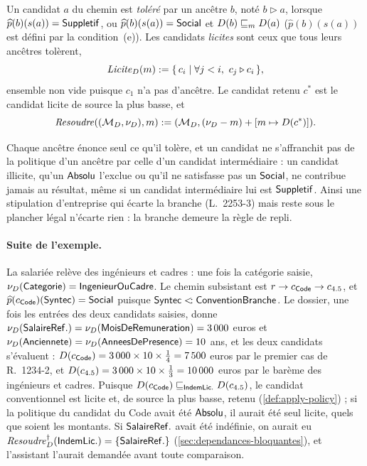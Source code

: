 \documentclass[review]{jflart}
\begin{document}
\begin{defi}\label{def:apply-policy}
Un candidat \(a\) du chemin est \emph{toléré} par un ancêtre \(b\), noté $b\triangleright a$, lorsque
\(\widehat p(b)(s(a))=\mathsf{Suppletif}\), ou \(\widehat p(b)(s(a))=\mathsf{Social}\) et
\(D(b)\mathrel{\sqsubseteq_{m}}D(a)\) (\(\widehat p(b)(s(a))\) est défini par la
condition~(e)). Les candidats \emph{licites} sont ceux que tous leurs
ancêtres tolèrent,
\[
 \mathit{Licite}_D(m):=\{\,c_i\mid \forall j<i,\ c_j \triangleright c_i\,\},
\]
ensemble non vide puisque \(c_1\) n'a pas d'ancêtre. Le candidat retenu
\(c^*\) est le candidat licite de source la plus basse, et
\begin{equation}
 \mathit{Resoudre}((\mathcal{M}_D,\nu_D),m):=(\mathcal{M}_D,(\nu_D-m)+[m\mapsto D(c^*)]).
 \label{eq:resolve}
\end{equation}
\end{defi}

Chaque ancêtre énonce seul ce qu'il tolère, et un candidat ne s'affranchit pas
de la politique d'un ancêtre par celle d'un candidat intermédiaire : un
candidat illicite, qu'un \(\mathsf{Absolu}\) l'exclue ou qu'il ne satisfasse pas un
\(\mathsf{Social}\), ne contribue jamais au résultat, même si un candidat
intermédiaire lui est \(\mathsf{Suppletif}\). Ainsi une stipulation d'entreprise qui
écarte la branche (L.~2253-3) mais reste sous le plancher légal n'écarte
rien : la branche demeure la règle de repli.

\paragraph{Suite de l'exemple.}
La salariée relève des ingénieurs et cadres : une fois la catégorie saisie,
\(\nu_D(\mathsf{Categorie})=\mathsf{IngenieurOuCadre}\). Le chemin subsistant est
\(r\to c_{\mathsf{Code}}\to c_{4.5}\), et
\(\widehat p(c_{\mathsf{Code}})(\mathsf{Syntec})=\mathsf{Social}\) puisque \(\mathsf{Syntec}\mathrel{<\!:}\mathsf{ConventionBranche}\).
Le dossier, une fois les entrées des deux candidats saisies, donne
\(\nu_D(\mathsf{SalaireRef.})=\nu_D(\mathsf{MoisDeRemuneration})=3\,000\) euros et
\(\nu_D(\mathsf{Anciennete})=\nu_D(\mathsf{AnneesDePresence})=10\) ans,
et les deux candidats s'évaluent : \(D(c_{\mathsf{Code}})=3\,000\times10\times\frac14
=7\,500\) euros par le premier cas de R.~1234-2, et
\(D(c_{4.5})=3\,000\times10\times\frac13=10\,000\) euros par le barème des
ingénieurs et cadres. Puisque \(D(c_{\mathsf{Code}})\mathrel{\sqsubseteq_{\mathsf{IndemLic.}}}D(c_{4.5})\),
le candidat conventionnel est licite et, de source la plus basse, retenu
(\autoref{def:apply-policy}) ; si la politique du candidat du Code avait été
\(\mathsf{Absolu}\), il aurait été seul licite, quels que soient les montants. Si
\(\mathsf{SalaireRef.}\) avait été indéfinie, on aurait eu
\(\mathit{Resoudre}^\dagger_D(\mathsf{IndemLic.})=\{\mathsf{SalaireRef.}\}\)
(\autoref{sec:dependances-bloquantes}), et l'assistant l'aurait demandée
avant toute comparaison.
\end{document}
